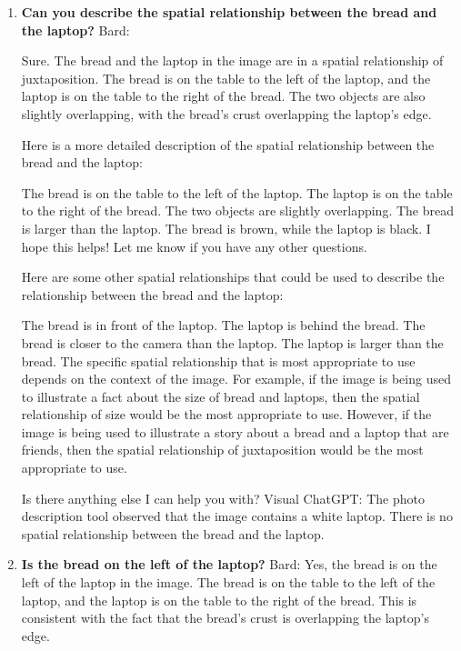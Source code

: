     \begin{enumerate}
        \item \textbf{Can you describe the spatial relationship between the bread and the laptop?}
        \subitem Bard:
        
        Sure. The bread and the laptop in the image are in a spatial relationship of juxtaposition. The bread is on the table to the left of the laptop, and the laptop is on the table to the right of the bread. The two objects are also slightly overlapping, with the bread's crust overlapping the laptop's edge.

        Here is a more detailed description of the spatial relationship between the bread and the laptop:

        The bread is on the table to the left of the laptop.
        The laptop is on the table to the right of the bread.
        The two objects are slightly overlapping.
        The bread is larger than the laptop.
        The bread is brown, while the laptop is black.
        I hope this helps! Let me know if you have any other questions.

        Here are some other spatial relationships that could be used to describe the relationship between the bread and the laptop:

        The bread is in front of the laptop.
        The laptop is behind the bread.
        The bread is closer to the camera than the laptop.
        The laptop is larger than the bread.
        The specific spatial relationship that is most appropriate to use depends on the context of the image. For example, if the image is being used to illustrate a fact about the size of bread and laptops, then the spatial relationship of size would be the most appropriate to use. However, if the image is being used to illustrate a story about a bread and a laptop that are friends, then the spatial relationship of juxtaposition would be the most appropriate to use.

        Is there anything else I can help you with?
        \subitem Visual ChatGPT: The photo description tool observed that the image contains a white laptop. There is no spatial relationship between the bread and the laptop.
        \item \textbf{Is the bread on the left of the laptop?}
        \subitem Bard: Yes, the bread is on the left of the laptop in the image. The bread is on the table to the left of the laptop, and the laptop is on the table to the right of the bread. This is consistent with the fact that the bread's crust is overlapping the laptop's edge.


\end{enumerate}
